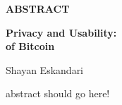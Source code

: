 

\setcounter{page}{3}
\vspace*{1cm}
\begin{center}
{\bf ABSTRACT}
\end{center}
\begin{center}
{\bf Privacy and Usability:}\\
{\bf of Bitcoin}
\end{center}
\vspace*{0.2in}
\begin{center}
Shayan Eskandari
\end{center}


abstract should go here!



